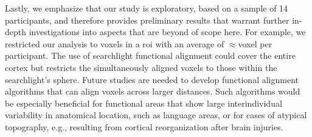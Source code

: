 %
Lastly, we emphasize that our study is exploratory, based on a sample of 14
participants, and therefore provides preliminary results that warrant further
in-depth investigations into aspects that are beyond of scope here.
%
For example, we restricted our analysis to voxels in a \ac{roi} with an average
of $\approx$\unit[1600]{voxel} per participant.
%
The use of searchlight functional alignment
\citep[e.g.,][]{zhang2016searchlight, guntupalli2016model} could cover the
entire cortex but restricts the simultaneously aligned voxels to those within
the searchlight's sphere.
%
Future studies are needed to develop functional alignment algorithms that can
align voxels across larger distances.
%
Such algorithms would be especially beneficial for functional areas that show
large interindividual variability in anatomical location, such as language
areas, or for cases of atypical topography, e.g., resulting from cortical
reorganization after brain injuries.



